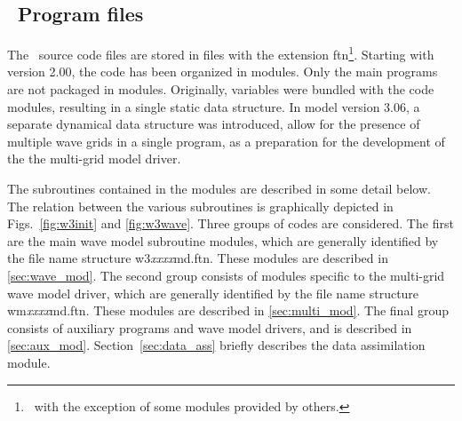 \vssub
\subsection{~Program files} \label{sec:files}
\vssub

The \ws\ source code files are stored in files with the extension {\file
  ftn}\footnote{~with the exception of some modules provided by others.}.
Starting with version 2.00, the code has been organized in modules. Only the
main programs are not packaged in modules.  Originally, variables were bundled
with the code modules, resulting in a single static data structure. In model
version 3.06, a separate dynamical data structure was introduced, allow for
the presence of multiple wave grids in a single program, as a preparation for
the development of the the multi-grid model driver.

The subroutines contained in the modules are described in some detail below.
The relation between the various subroutines is graphically depicted in
Figs.~\ref{fig:w3init} and \ref{fig:w3wave}. Three groups of codes are
considered. The first are the main wave model subroutine modules, which are
generally identified by the file name structure {\file
  w3{\it{xxxx}}md.ftn}. These modules are described
in \para\ref{sec:wave_mod}.  The second group consists of modules specific to
the multi-grid wave model driver, which are generally identified by the file
name structure {\file wm{\it{xxxx}}md.ftn}. These modules are described
in \para\ref{sec:multi_mod}.  The final group consists of auxiliary programs
and wave model drivers, and is described
in \para\ref{sec:aux_mod}. Section~\ref{sec:data_ass} briefly describes the
data assimilation module.
